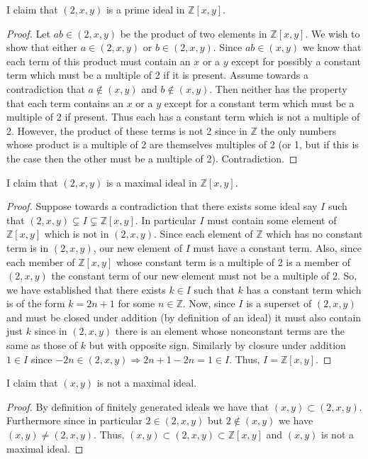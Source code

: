 \documentclass[12pt]{article}
\begin{document}
I claim that  $(2,x,y)$ is a prime ideal in $\mathbb{Z}[x,y]$.
\begin{proof}
Let $a b \in (2,x,y)$ be the product of two elements in $\mathbb{Z}[x,y]$. We wish to show that either $a \in (2,x,y)$ or $b \in (2,x,y)$. Since $a b \in (x,y)$ we know that each term of this product must contain an $x$ or a $y$ except for possibly a constant term which must be a multiple of 2 if it is present. Assume towards a contradiction that $a \notin (x,y)$ and $b \notin (x,y)$. Then neither has the property that each term contains an $x$ or a $y$ except for a constant term which must be a multiple of 2 if present. Thus each has a constant term which is not a multiple of 2. However, the product of these terms is not 2 since in $\mathbb{Z}$ the only numbers whose product is a multiple of 2 are themselves multiples of 2 (or 1, but if this is the case then the other must be a multiple of 2). Contradiction.
\end{proof}

I claim that $(2,x,y)$ is a maximal ideal in  $\mathbb{Z}[x,y]$.
\begin{proof}
Suppose towards a contradiction that there exists some ideal say $I$ such that $(2,x,y ) \subsetneq I \subsetneq \mathbb{Z}[x,y]$. In particular $I$ must contain some element of $\mathbb{Z}[x,y]$ which is not in $(2,x,y)$. Since each element of $\mathbb{Z}$ which has no constant term is in $(2,x,y)$, our new element of $I$ must have a constant term. Also, since each member of $\mathbb{Z}[x,y]$ whose constant term is a multiple of 2 is a member of $(2,x,y)$ the constant term of our new element must not be a multiple of 2. So, we have established that there exists $k \in I $ such that $k$ has a constant term which is of the form $k=2n+1$ for some $n \in \mathbb{Z}$. Now, since $I$ is a superset of $(2,x,y)$ and must be closed under addition (by definition of an ideal) it must also contain just $k$ since in $(2,x,y)$ there is an element whose nonconstant terms are the same as those of $k$ but with opposite sign. Similarly by closure under addition $1 \in I$ since $-2n \in (2,x,y) \Rightarrow 2n+1-2n = 1 \in I$. Thus, $I = \mathbb{Z}[x,y]$.
\end{proof}

I claim that $(x,y)$ is not a maximal ideal.
\begin{proof}
By definition of finitely generated ideals we have that $(x,y) \subset (2,x,y)$. Furthermore since in particular $2 \in (2,x,y)$ but $ 2 \notin (x,y)$ we have $(x,y) \neq (2,x,y)$. Thus, $(x,y)\subset (2,x,y) \subset \mathbb{Z}[x,y]$ and $(x,y)$ is not a maximal ideal.
\end{proof}
\end{document}
